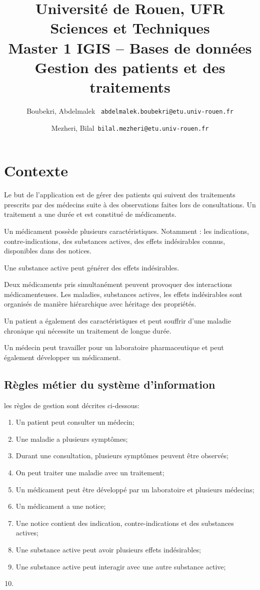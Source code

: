 \documentclass[12pt,a4paper]{article}
\author{
	Boubekri, Abdelmalek \     \texttt{abdelmalek.boubekri@etu.univ-rouen.fr}
	\and
	Mezheri, Bilal\   		   \texttt{bilal.mezheri@etu.univ-rouen.fr}
}
\title{	Université de Rouen, UFR Sciences et Techniques\\
		Master 1 IGIS – Bases de données\\
		Gestion des patients et des traitements\\ }
\begin{document}
	
	\maketitle
	\newpage
	
	\tableofcontents
	\makenomenclature
	\printnomenclature


\section{Contexte}


Le but de l’application est de gérer des patients qui suivent des traitements
prescrits par des médecins suite à des observations faites lors de consultations.
Un traitement a une durée et est constitué de médicaments.

Un médicament possède plusieurs caractéristiques. Notamment : les indications, contre-indications, des substances actives, des effets indésirables connus, disponibles dans des notices.

Une substance active peut générer des effets indésirables.

Deux médicaments pris simultanément peuvent provoquer des interactions médicamenteuses.
Les maladies, substances actives, les effets indésirables sont organisés de manière hiérarchique avec héritage des propriétés.

Un patient a également des caractéristiques et peut souffrir d’une maladie chronique qui nécessite un traitement de longue durée.

Un médecin peut travailler pour un laboratoire pharmaceutique et peut également développer un médicament.

\subsection{Règles métier du système d'information}
les règles de gestion sont décrites ci-dessous:

\begin{enumerate}

\item Un patient peut consulter un médecin;
\item Une maladie a plusieurs symptômes;
\item Durant une consultation, plusieurs symptômes peuvent être observés;
\item On peut traiter une maladie avec un traitement;
\item Un médicament peut être développé par un laboratoire et plusieurs médecins;
\item Un médicament a une notice;
\item Une notice contient des indication, contre-indications et des substances actives;
\item Une substance active peut avoir plusieurs effets indésirables;
\item Une substance active peut interagir avec une autre substance active;
\item 

\end{enumerate}
\end{document}
